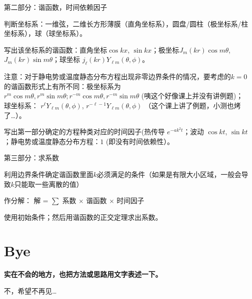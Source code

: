 \documentclass[CJK]{beamer}
\begin{document}
\begin{frame}
\bch
第二部分：谐函数，时间依赖因子
\bitem
\item{判断坐标系：一维弦，二维长方形薄膜（直角坐标系），圆盘/圆柱（极坐标系/柱坐标系），球（球坐标系）。}
\item{写出该坐标系的谐函数：直角坐标$\cos kx$, $\sin kx$；极坐标$J_m(kr)\cos m\theta$, $J_m(kr)\sin m\theta$；球坐标 $j_\ell(kr)Y_{\ell m}(\theta,\phi)$。

  注意：对于静电势或温度静态分布方程出现非零边界条件的情况，要考虑的$k=0$的谐函数形式上有所不同：极坐标系为$r^m\cos m\theta, r^m \sin m\theta; r^{-m}\cos m\theta, r^{-m}\sin m\theta$ (咦这个好像课上并没有讲例题)； 球坐标系： $r^\ell Y_{\ell m}(\theta,\phi)$, $r^{-\ell-1}Y_{\ell m}(\theta,\phi)$ （这个课上讲了例题，小测也烤了…）。}  
\item{写出第一部分确定的方程种类对应的时间因子(热传导 $e^{-ak^2t}$；波动 $\cos kt$, $\sin kt$；静电势或温度静态分布方程：$1$ (即没有时间依赖性）。}
  \eitem
  \ech
\end{frame}


\begin{frame}
\bch
第三部分：求系数
\bitem
\item{利用边界条件确定谐函数里面$k$必须满足的条件（如果是有限大小区域，一般会导致$k$只能取一些离散的值）}
\item{作分解： 解 = $\sum$ 系数 $\times$ 谐函数 $\times$ 时间因子}
\item{使用初始条件；然后用谐函数的正交定理求出系数。}  
  \eitem
  \ech
\end{frame}

\section{Bye}

\begin{frame}
\bch

\bcenter



\skiplines

{\large  \bf 实在不会的地方，也把方法或思路用文字表述一下。}
\ecenter

\ech
\end{frame}



\begin{frame}

\bch


\bcenter


\skiplines

\skiplines

{\Large 不，希望不再见…
}
\ecenter
\ech
\end{frame}
\end{document}
